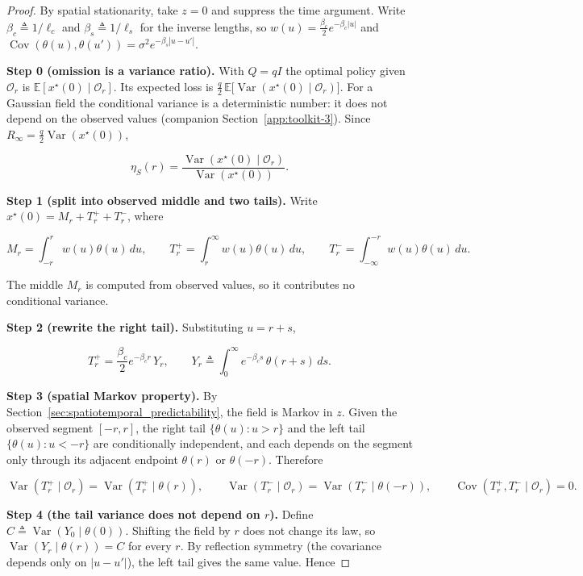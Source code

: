 \begin{proof}
By spatial stationarity, take $z=0$ and suppress the time argument. Write $\beta_c\triangleq1/\ell_c$ and $\beta_s\triangleq1/\ell_s$ for the inverse lengths, so $w(u)=\tfrac{\beta_c}{2}e^{-\beta_c|u|}$ and $\operatorname{Cov}(\theta(u),\theta(u'))=\sigma^2e^{-\beta_s|u-u'|}$.

\textbf{Step 0 (omission is a variance ratio).} With $Q=qI$ the optimal policy given $\mathcal O_r$ is $\mathbb E[x^\star(0)\mid\mathcal O_r]$. Its expected loss is $\tfrac q2\,\mathbb E\big[\operatorname{Var}(x^\star(0)\mid\mathcal O_r)\big]$. For a Gaussian field the conditional variance is a deterministic number: it does not depend on the observed values (companion Section~\ref{app:toolkit-3}). Since $R_\infty=\tfrac q2\operatorname{Var}(x^\star(0))$,

\[
\eta_S(r)=\frac{\operatorname{Var}(x^\star(0)\mid\mathcal O_r)}{\operatorname{Var}(x^\star(0))}.
\]

\textbf{Step 1 (split into observed middle and two tails).} Write $x^\star(0)=M_r+T_r^++T_r^-$, where

\[
M_r=\int_{-r}^{r}w(u)\theta(u)\,du,\qquad T_r^+=\int_r^\infty w(u)\theta(u)\,du,\qquad T_r^-=\int_{-\infty}^{-r}w(u)\theta(u)\,du .
\]

The middle $M_r$ is computed from observed values, so it contributes no conditional variance.

\textbf{Step 2 (rewrite the right tail).} Substituting $u=r+s$,

\[
T_r^+=\frac{\beta_c}{2}e^{-\beta_c r}\,Y_r,\qquad Y_r\triangleq\int_0^\infty e^{-\beta_c s}\,\theta(r+s)\,ds .
\]

\textbf{Step 3 (spatial Markov property).} By Section~\ref{sec:spatiotemporal_predictability}, the field is Markov in $z$. Given the observed segment $[-r,r]$, the right tail $\{\theta(u):u>r\}$ and the left tail $\{\theta(u):u<-r\}$ are conditionally independent, and each depends on the segment only through its adjacent endpoint $\theta(r)$ or $\theta(-r)$. Therefore

\[
\operatorname{Var}(T_r^+\mid\mathcal O_r)=\operatorname{Var}(T_r^+\mid\theta(r)),\qquad \operatorname{Var}(T_r^-\mid\mathcal O_r)=\operatorname{Var}(T_r^-\mid\theta(-r)),\qquad \operatorname{Cov}(T_r^+,T_r^-\mid\mathcal O_r)=0 .
\]

\textbf{Step 4 (the tail variance does not depend on $r$).} Define $C\triangleq\operatorname{Var}(Y_0\mid\theta(0))$. Shifting the field by $r$ does not change its law, so $\operatorname{Var}(Y_r\mid\theta(r))=C$ for every $r$. By reflection symmetry (the covariance depends only on $|u-u'|$), the left tail gives the same value. Hence


\end{proof}
